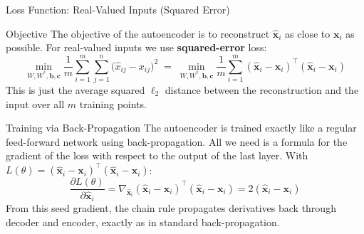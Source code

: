 \documentclass{beamer}
\begin{document}
\begin{frame}[shrink=10]{Loss Function: Real-Valued Inputs (Squared Error)}
  \begin{block}{Objective}
    The objective of the autoencoder is to reconstruct $\hat{\mathbf{x}}_i$
    as close to $\mathbf{x}_i$ as possible. For real-valued inputs we use
    \textbf{squared-error} loss:
    \[
      \min_{W,W^{*},\mathbf{b},\mathbf{c}}
        \frac{1}{m}\sum_{i=1}^{m}\sum_{j=1}^{n}
        \bigl(\hat{x}_{ij} - x_{ij}\bigr)^2
      \;=\;
      \min_{W,W^{*},\mathbf{b},\mathbf{c}}
        \frac{1}{m}\sum_{i=1}^{m}
        (\hat{\mathbf{x}}_i - \mathbf{x}_i)^{\!\top}
        (\hat{\mathbf{x}}_i - \mathbf{x}_i)
    \]
    This is just the average squared $\ell_2$ distance between the
    reconstruction and the input over all $m$ training points.
  \end{block}

  \begin{block}{Training via Back-Propagation}
    The autoencoder is trained exactly like a regular feed-forward network
    using back-propagation. All we need is a formula for the gradient of
    the loss with respect to the output of the last layer.
    With $L(\theta) = (\hat{\mathbf{x}}_i - \mathbf{x}_i)^{\!\top}
    (\hat{\mathbf{x}}_i - \mathbf{x}_i)$:
    \[
      \frac{\partial L(\theta)}{\partial \hat{\mathbf{x}}_i}
        = \nabla_{\hat{\mathbf{x}}_i}
          (\hat{\mathbf{x}}_i - \mathbf{x}_i)^{\!\top}
          (\hat{\mathbf{x}}_i - \mathbf{x}_i)
        = 2(\hat{\mathbf{x}}_i - \mathbf{x}_i)
    \]
    From this seed gradient, the chain rule propagates derivatives back
    through decoder and encoder, exactly as in standard back-propagation.
  \end{block}
\end{frame}
\end{document}
